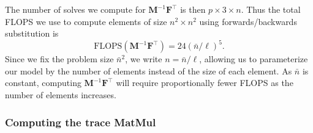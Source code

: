 %
%
%
\noindent
The number of solves we compute for $\textbf{M}^{-1}\textbf{F}^\intercal$ is then $p \times 3 \times n$.
Thus the total FLOPS we use to compute elements of size $n^2 \times n^2$ using forwards/backwards substitution is 
\begin{equation}
	\text{FLOPS}(\textbf{M}^{-1}\textbf{F}^\intercal) = 24 (\bar{n}/\ell)^5.
	\label{eqn:flops_mf}
\end{equation}
\noindent
Since we fix the problem size $\bar{n}^2$, we write $n = \bar{n}/\ell$, allowing us to parameterize our model by the number of elements instead of the size of each element. 
As $\bar{n}$ is constant, computing $\textbf{M}^{-1}\textbf{F}^\intercal$ will require proportionally fewer FLOPS as the number of elements increases.

%
%
%
\subsubsection{Computing the trace MatMul} 

